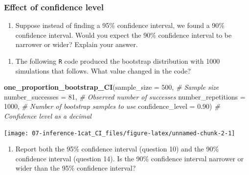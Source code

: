 \documentclass[
]{report}
\newenvironment{Shaded}{\begin{snugshade}}{\end{snugshade}}
\newcommand{\CommentTok}[1]{\textcolor[rgb]{0.56,0.35,0.01}{\textit{#1}}}
\newcommand{\DataTypeTok}[1]{\textcolor[rgb]{0.13,0.29,0.53}{#1}}
\newcommand{\DecValTok}[1]{\textcolor[rgb]{0.00,0.00,0.81}{#1}}
\newcommand{\FloatTok}[1]{\textcolor[rgb]{0.00,0.00,0.81}{#1}}
\newcommand{\KeywordTok}[1]{\textcolor[rgb]{0.13,0.29,0.53}{\textbf{#1}}}
\newcommand{\NormalTok}[1]{#1}
\providecommand{\tightlist}{%
  \setlength{\itemsep}{0pt}\setlength{\parskip}{0pt}}
\begin{document}
\vspace{1in}

\newpage

\hypertarget{effect-of-confidence-level}{%
\subsubsection{Effect of confidence level}\label{effect-of-confidence-level}}

\begin{enumerate}
\def\labelenumi{\arabic{enumi}.}
\setcounter{enumi}{12}
\tightlist
\item
  Suppose instead of finding a 95\% confidence interval, we found a 90\% confidence interval. Would you expect the 90\% confidence interval to be narrower or wider? Explain your answer.
\end{enumerate}

\vspace{0.5in}

\begin{enumerate}
\def\labelenumi{\arabic{enumi}.}
\setcounter{enumi}{13}
\tightlist
\item
  The following \texttt{R} code produced the bootstrap distribution with 1000 simulations that follows. What value changed in the code?
\end{enumerate}

\begin{Shaded}
\begin{Highlighting}[]
\KeywordTok{one\_proportion\_bootstrap\_CI}\NormalTok{(}\DataTypeTok{sample\_size =} \DecValTok{500}\NormalTok{, }\CommentTok{\# Sample size}
                    \DataTypeTok{number\_successes =} \DecValTok{81}\NormalTok{, }\CommentTok{\# Observed number of successes}
                    \DataTypeTok{number\_repetitions =} \DecValTok{1000}\NormalTok{, }\CommentTok{\# Number of bootstrap samples to use}
                    \DataTypeTok{confidence\_level =} \FloatTok{0.90}\NormalTok{) }\CommentTok{\# Confidence level as a decimal}
\end{Highlighting}
\end{Shaded}

\begin{center}\texttt{[image: 07-inference-1cat\_CI\_files/figure-latex/unnamed-chunk-2-1]} \end{center}

\vspace{0.5in}

\begin{enumerate}
\def\labelenumi{\arabic{enumi}.}
\setcounter{enumi}{14}
\tightlist
\item
  Report both the 95\% confidence interval (question 10) and the 90\% confidence interval (question 14). Is the 90\% confidence interval narrower or wider than the 95\% confidence interval?
\end{enumerate}
\end{document}
